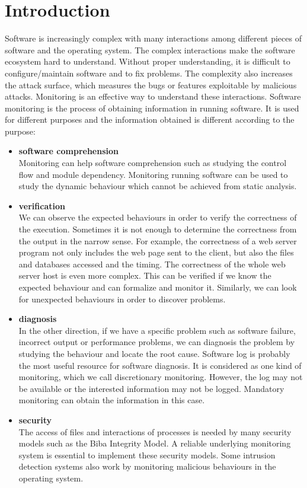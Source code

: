 \chapter{Introduction}

Software is increasingly complex with many interactions among
different pieces of software and the operating system.
The complex interactions make the software ecosystem hard to understand.
Without proper understanding,
it is difficult to configure/maintain software and to fix problems.
The complexity also increases the attack surface\cite{manadhata2006attack}, which measures the
bugs or features exploitable by malicious attacks.
Monitoring is an effective way to understand these interactions.
Software monitoring is the process of obtaining information
in running software.
It is used for different purposes and the information obtained is different
according to the purpose:

\begin{itemize}
\item {\bf software comprehension} \\
Monitoring can help software comprehension such as studying the control
flow and module dependency.
Monitoring running software can be used to study the dynamic behaviour which
cannot be achieved from static analysis.
\item {\bf verification} \\
We can observe the expected behaviours in order to
verify the correctness of the execution.
Sometimes it is not enough to determine the correctness from the output in
the narrow sense.
For example, the correctness of a web server program not only includes
the web page sent to the client,
but also the files and databases accessed and the timing.
The correctness of the whole web server host is even more complex.
This can be verified if we know the expected behaviour and
can formalize and monitor it.
Similarly, we can look for unexpected behaviours in order to discover problems.
\item {\bf diagnosis} \\
In the other direction, if we have a specific problem such as software failure,
incorrect output or performance problems, we can diagnosis the problem by
studying the behaviour and locate the root cause.
Software log is probably the most useful resource for software diagnosis.
It is considered as one kind of monitoring,
which we call discretionary monitoring.
However, the log may not be available or the interested information
may not be logged.
Mandatory monitoring can obtain the information in this case.
\item {\bf security} \\
The access of files and interactions of processes is needed by many
security models such as the Biba Integrity Model.
A reliable underlying monitoring system is essential to implement
these security models.
Some intrusion detection systems also work by monitoring malicious
behaviours in the operating system.
\end{itemize}

